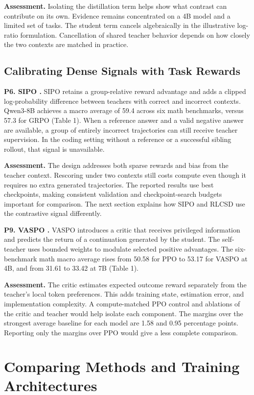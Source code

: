 \documentclass[11pt,a4paper]{article}
\begin{document}
\textbf{Assessment.} Isolating the distillation term helps show what contrast can contribute on its own. Evidence remains concentrated on a 4B model and a limited set of tasks. The student term cancels algebraically in the illustrative log-ratio formulation. Cancellation of shared teacher behavior depends on how closely the two contexts are matched in practice.

\subsection{Calibrating Dense Signals with Task Rewards}
\textbf{P6. SIPO \cite{p6}.} SIPO retains a group-relative reward advantage and adds a clipped log-probability difference between teachers with correct and incorrect contexts. Qwen3-8B achieves a macro average of 59.4 across six math benchmarks, versus 57.3 for GRPO (Table 1). When a reference answer and a valid negative answer are available, a group of entirely incorrect trajectories can still receive teacher supervision. In the coding setting without a reference or a successful sibling rollout, that signal is unavailable.

\textbf{Assessment.} The design addresses both sparse rewards and bias from the teacher context. Rescoring under two contexts still costs compute even though it requires no extra generated trajectories. The reported results use best checkpoints, making consistent validation and checkpoint-search budgets important for comparison. The next section explains how SIPO and RLCSD use the contrastive signal differently.

\textbf{P9. VASPO \cite{p9}.} VASPO introduces a critic that receives privileged information and predicts the return of a continuation generated by the student. The self-teacher uses bounded weights to modulate selected positive advantages. The six-benchmark math macro average rises from 50.58 for PPO to 53.17 for VASPO at 4B, and from 31.61 to 33.42 at 7B (Table 1).

\textbf{Assessment.} The critic estimates expected outcome reward separately from the teacher's local token preferences. This adds training state, estimation error, and implementation complexity. A compute-matched PPO control and ablations of the critic and teacher would help isolate each component. The margins over the strongest average baseline for each model are 1.58 and 0.95 percentage points. Reporting only the margins over PPO would give a less complete comparison.

\section{Comparing Methods and Training Architectures}
\end{document}
